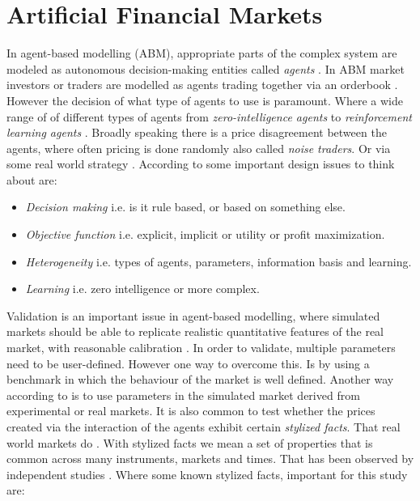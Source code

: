\documentclass{kththesis}
\theoremstyle{definition}
\begin{document}


\newpage

\section{Artificial Financial Markets}
In agent-based modelling (ABM), appropriate parts of the complex system are modeled as autonomous decision-making entities called \textit{agents} \parencite{darley2007nasdaq}. In ABM market investors or traders are modelled as agents trading together via an orderbook \parencite{lussange2018bright}. However the decision of what type of agents to use is paramount. Where a wide range of of different types of agents from \textit{zero-intelligence agents} to \textit{reinforcement learning agents} \parencite{martinez2009evolutionary}. Broadly speaking there is a price disagreement between the agents, where often pricing is done randomly also called \textit{noise traders}. Or via some real world strategy \parencite{lussange2018bright}. According to \textcite{martinez2009evolutionary} some important design issues to think about are:

\begin{itemize}
    \item \textit{Decision making} i.e. is it rule based, or based on something else.
    \item \textit{Objective function} i.e. explicit, implicit or utility or profit maximization.
    \item \textit{Heterogeneity} i.e. types of agents, parameters, information basis and learning.
    \item \textit{Learning} i.e. zero intelligence or more complex.
\end{itemize}
Validation is an important issue in agent-based modelling, where simulated markets should be able to replicate realistic quantitative features of the real market, with reasonable calibration \parencite{martinez2009evolutionary}. In order to validate, multiple parameters need to be user-defined. However one way to overcome this. Is by using a benchmark in which the behaviour of the market is well defined. Another way according to \textcite{martinez2009evolutionary} is to use parameters in the simulated market derived from experimental or real markets. 
\newline
\newline
It is also common to test whether the prices created via the interaction of the agents exhibit certain \textit{stylized facts}. That real world markets do \parencite{brandouy2011design}. With stylized facts we mean a set of properties that is common across many instruments, markets and times. That has been observed by independent studies \parencite{cont2001empirical}. Where some known stylized facts, important for this study are:
\end{document}

